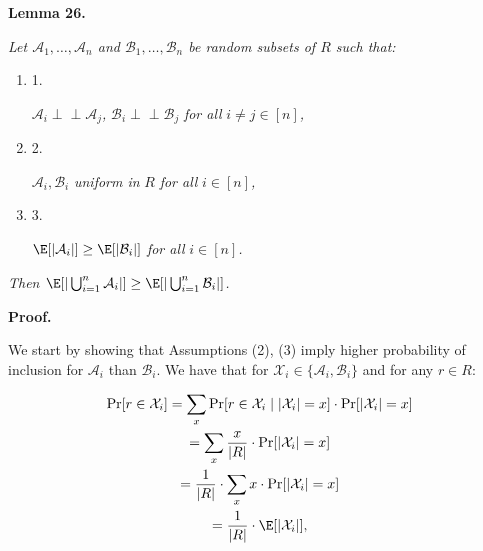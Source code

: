 \documentclass[10pt,a4paper]{article}
\begin{document}


\par\medskip\noindent\textbf{\textbf{Lemma 26}\textbf{.}}\par



\emph{Let $\mathcal{A}_{1},\dots,\mathcal{A}_{n}$ and $\mathcal{B}_{1},\dots,\mathcal{B}_{n}$ be random subsets of $R$ such that:}\par


\begin{enumerate}


\item[] 1. 


$\mathcal{A}_{i}\perp\!\!\!\!\perp\mathcal{A}_{j}$\emph{, }$\mathcal{B}_{i}\perp\!\!\!\!\perp\mathcal{B}_{j}$\emph{ for all }$i\neq j\in[n]$\emph{,}\par




\item[] 2. 


$\mathcal{A}_{i},\mathcal{B}_{i}$\emph{ uniform in }$R$\emph{ for all }$i\in[n]$\emph{,}\par




\item[] 3. 


$\E[|\mathcal{A}_{i}|]\geq\E[|\mathcal{B}_{i}|]$\emph{ for all }$i\in[n]$\emph{.}\par




\end{enumerate}


\emph{Then $\E[|\bigcup_{i=1}^{n}\mathcal{A}_{i}|]\geq\E[|\bigcup_{i=1}^{n}\mathcal{B}_{i}|]$.}\par






\par\medskip\noindent\textbf{Proof.}\par



We start by showing that Assumptions (2), (3) imply higher probability of inclusion for $\mathcal{A}_{i}$ than $\mathcal{B}_{i}$.
We have that for $\mathcal{X}_{i}\in\{\mathcal{A}_{i},\mathcal{B}_{i}\}$ and for any $r\in R$:\par


\[\begin{gathered}
\displaystyle\Pr[r\in\mathcal{X}_{i}] \displaystyle=\sum_{x}{\Pr[r\in\mathcal{X}_{i}\mid|\mathcal{X}_{i}|=x]\cdot\Pr[|\mathcal{X}_{i}|=x]} \\
\displaystyle=\sum_{x}{\frac{x}{|R|}\cdot\Pr[|\mathcal{X}_{i}|=x]} \\
\displaystyle=\frac{1}{|R|}\cdot\sum_{x}{x\cdot\Pr[|\mathcal{X}_{i}|=x]} \\
\displaystyle=\frac{1}{|R|}\cdot\E[|\mathcal{X}_{i}|],
\end{gathered}\]
\end{document}

